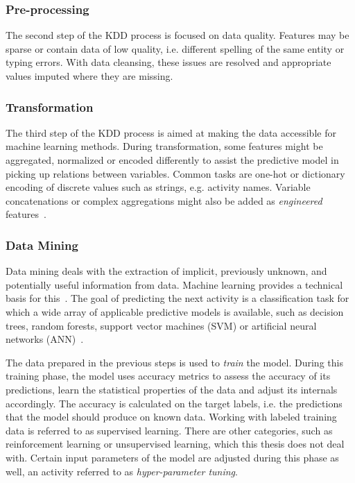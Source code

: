 \subsubsection*{Pre-processing}
The second step of the KDD process is focused on data quality. Features may be sparse or contain data of low quality, i.e. different spelling of the same entity or typing errors. With data cleansing, these issues are resolved and appropriate values imputed where they are missing.

\subsubsection*{Transformation}\label{sec:predictive-model-development:transformation}
The third step of the KDD process is aimed at making the data accessible for machine learning methods. During transformation, some features might be aggregated, normalized or encoded differently to assist the predictive model in picking up relations between variables. Common tasks are one-hot or dictionary encoding of discrete values such as strings, e.g. activity names. Variable concatenations or complex aggregations might also be added as \textit{engineered} features~\cite{kuhn2013applied}.

\subsubsection*{Data Mining}
Data mining deals with the extraction of implicit, previously unknown, and potentially useful information from data. Machine learning provides a technical basis for this~\cite{Aalst2016}. The goal of predicting the next activity is a classification task for which a wide array of applicable predictive models is available, such as decision trees, random forests, support vector machines (SVM) or artificial neural networks (ANN)~\cite{kuhn2013applied}.

The data prepared in the previous steps is used to \textit{train} the model. During this training phase, the model uses accuracy metrics to assess the accuracy of its predictions, learn the statistical properties of the data and adjust its internals accordingly. The accuracy is calculated on the target labels, i.e. the predictions that the model should produce on known data. Working with labeled training data is referred to as supervised learning. There are other categories, such as reinforcement learning or unsupervised learning, which this thesis does not deal with. Certain input parameters of the model are adjusted during this phase as well, an activity referred to as \textit{hyper-parameter tuning}.


